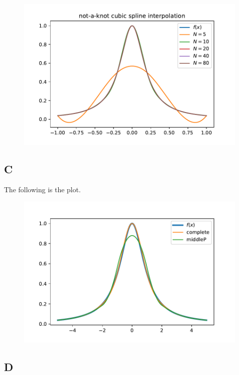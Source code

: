 \documentclass[12pt]{article}
\begin{document}
        \begin{figure}[H]
            \centering
            \includegraphics{pics/B_notAknot}
        \end{figure}

    \subsection{C}

        The following is the plot.
        \begin{figure}[H]
            \centering
            \includegraphics{pics/C}
        \end{figure}

    \subsection{D}
\end{document}
